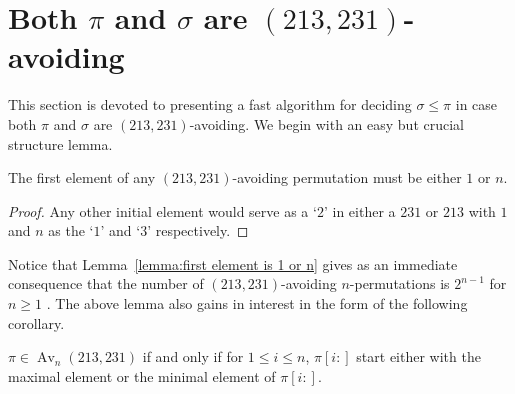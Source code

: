 \documentclass[a4paper]{llncs}
\DeclareMathOperator{\AV}{Av}
\DeclareMathOperator{\Avd}{Av}
\newcommand\Av[2]{\Avd_{{#1}}({#2})}
\DeclareMathOperator{\stripea}{s}
\newcommand{\stripe}[2]{\stripea_{{#1}}[{#2}]}
\newcounter{num}
\newcommand{\dstep}{d}
\newcommand{\ustep}{a}
\begin{document}


\section{Both $\pi$ and $\sigma$ are $(213,231)$-avoiding}
\label{section:both are (231,213)-avoiding}

This section is devoted to presenting a fast algorithm for deciding
$\sigma \leq \pi$
in case both $\pi$ and $\sigma$ are $(213,231)$-avoiding.
We begin with an easy but crucial structure lemma.

\begin{lemma}[Folklore]
\label{lemma:first element is 1 or n}
The first element of any $(213,231)$-avoiding permutation
must be either $1$ or $n$.
\end{lemma}

\begin{proof}
Any other initial element would serve as a `$2$' in either a
$231$ or $213$ with $1$ and $n$ as the `$1$' and `$3$' respectively.
\end{proof}

Notice that Lemma~\ref{lemma:first element is 1 or n} gives as an
immediate consequence that the number of $(213,231)$-avoiding $n$-permutations
is $2^{n-1}$ for $n\geq 1$ \cite{Simion:Schmidt:EJC:1985}.
The above lemma also gains in interest in the form of the following corollary.

\begin{corollary}
\label{corollary:minmaxelement}
$\pi \in \AV_n(213,231)$ if and only if for $1 \leq i \leq n$,
$\pi[i:]$ start either with the maximal element
or the minimal element of $\pi[i:]$.
\end{corollary}

%
\end{document}
